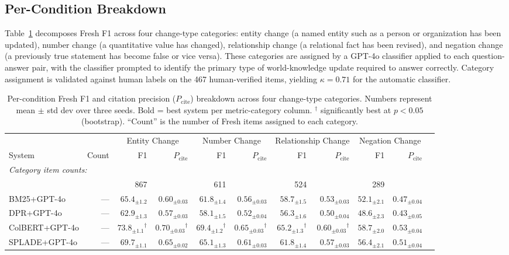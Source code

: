 \subsection{Per-Condition Breakdown}

Table~\ref{tab:per-condition} decomposes Fresh F1 across four change-type categories: entity change (a named entity such as a person or organization has been updated), number change (a quantitative value has changed), relationship change (a relational fact has been revised), and negation change (a previously true statement has become false or vice versa). These categories are assigned by a GPT-4o classifier applied to each question-answer pair, with the classifier prompted to identify the primary type of world-knowledge update required to answer correctly. Category assignment is validated against human labels on the 467 human-verified items, yielding $\kappa = 0.71$ for the automatic classifier.

\begin{table}[t]
\centering
\footnotesize
\setlength{\tabcolsep}{3.5pt}
\caption{Per-condition Fresh F1 and citation precision ($P_{\text{cite}}$) breakdown across four change-type categories. Numbers represent mean $\pm$ std dev over three seeds. Bold = best system per metric-category column. $^{\dagger}$ significantly best at $p{<}0.05$ (bootstrap). ``Count'' is the number of Fresh items assigned to each category.}
\label{tab:per-condition}
\begin{tabular}{lrrrrrrrrrr}
\toprule
& & \multicolumn{2}{c}{Entity Change} & \multicolumn{2}{c}{Number Change} & \multicolumn{2}{c}{Relationship Change} & \multicolumn{2}{c}{Negation Change} \\
\cmidrule(lr){3-4}\cmidrule(lr){5-6}\cmidrule(lr){7-8}\cmidrule(lr){9-10}
System & Count & F1 & $P_{\text{cite}}$ & F1 & $P_{\text{cite}}$ & F1 & $P_{\text{cite}}$ & F1 & $P_{\text{cite}}$ \\
\midrule
\multicolumn{2}{l}{\textit{Category item counts:}} \\
& & 867 & & 611 & & 524 & & 289 & \\
\addlinespace
BM25+GPT-4o    & --- & $65.4_{\pm 1.2}$ & $0.60_{\pm 0.03}$ & $61.8_{\pm 1.4}$ & $0.56_{\pm 0.03}$ & $58.7_{\pm 1.5}$ & $0.53_{\pm 0.03}$ & $52.1_{\pm 2.1}$ & $0.47_{\pm 0.04}$ \\
DPR+GPT-4o     & --- & $62.9_{\pm 1.3}$ & $0.57_{\pm 0.03}$ & $58.1_{\pm 1.5}$ & $0.52_{\pm 0.04}$ & $56.3_{\pm 1.6}$ & $0.50_{\pm 0.04}$ & $48.6_{\pm 2.3}$ & $0.43_{\pm 0.05}$ \\
ColBERT+GPT-4o & --- & $\mathbf{73.8_{\pm 1.1}}^{\dagger}$ & $\mathbf{0.70_{\pm 0.03}}^{\dagger}$ & $\mathbf{69.4_{\pm 1.2}}^{\dagger}$ & $\mathbf{0.65_{\pm 0.03}}^{\dagger}$ & $\mathbf{65.2_{\pm 1.3}}^{\dagger}$ & $\mathbf{0.60_{\pm 0.03}}^{\dagger}$ & $\mathbf{58.7_{\pm 2.0}}$ & $\mathbf{0.53_{\pm 0.04}}$ \\
SPLADE+GPT-4o  & --- & $69.7_{\pm 1.1}$ & $0.65_{\pm 0.02}$ & $65.1_{\pm 1.3}$ & $0.61_{\pm 0.03}$ & $61.8_{\pm 1.4}$ & $0.57_{\pm 0.03}$ & $56.4_{\pm 2.1}$ & $0.51_{\pm 0.04}$ \\
\bottomrule
\end{tabular}
\end{table}

